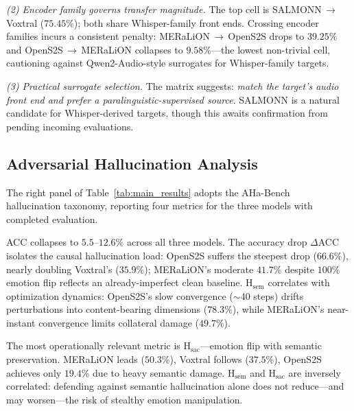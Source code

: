 \textit{(2) Encoder family governs transfer magnitude.}
The top cell is SALMONN\,$\rightarrow$\,Voxtral ($75.45\%$); both share Whisper-family front ends.
Crossing encoder families incurs a consistent penalty: MERaLiON\,$\rightarrow$\,OpenS2S drops to $39.25\%$ and OpenS2S\,$\rightarrow$\,MERaLiON collapses to $9.58\%$---the lowest non-trivial cell, cautioning against Qwen2-Audio-style surrogates for Whisper-family targets.

\textit{(3) Practical surrogate selection.}
The matrix suggests: \emph{match the target's audio front end and prefer a paralinguistic-supervised source}.
SALMONN is a natural candidate for Whisper-derived targets, though this awaits confirmation from pending incoming evaluations.


\subsection{Adversarial Hallucination Analysis}
\label{sec:exp_quality}

The right panel of Table~\ref{tab:main_results} adopts the AHa-Bench~\cite{aha-bench} hallucination taxonomy, reporting four metrics for the three models with completed evaluation.

ACC collapses to $5.5$--$12.6\%$ across all three models.
The accuracy drop $\Delta$ACC isolates the causal hallucination load: OpenS2S suffers the steepest drop ($66.6\%$), nearly doubling Voxtral's ($35.9\%$); MERaLiON's moderate $41.7\%$ despite $100\%$ emotion flip reflects an already-imperfect clean baseline.
H$_{\text{sem}}$ correlates with optimization dynamics: OpenS2S's slow convergence ($\sim$40 steps) drifts perturbations into content-bearing dimensions ($78.3\%$), while MERaLiON's near-instant convergence limits collateral damage ($49.7\%$).

The most operationally relevant metric is H$_{\text{sac}}$---emotion flip with semantic preservation.
MERaLiON leads ($50.3\%$), Voxtral follows ($37.5\%$), OpenS2S achieves only $19.4\%$ due to heavy semantic damage.
H$_{\text{sem}}$ and H$_{\text{sac}}$ are inversely correlated: defending against semantic hallucination alone does not reduce---and may worsen---the risk of stealthy emotion manipulation.

